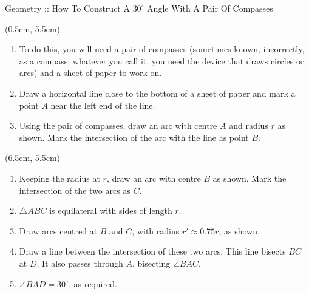 \documentclass[8pt,xcolor={svgnames, x11names}]{beamer}
\begin{document}
\begin{frame}{Geometry :: How To Construct A $30^\circ$ Angle With A Pair Of Compasses}
\begin{textblock*}{0.8\textwidth}
{\begin{scope}[scale=0.85]
			
			
		 \end{scope}
		} %
	\end{textblock*}

	

	\begin{textblock*}{0.55\textwidth}(0.5cm, 5.5cm)
		
		\begin{enumerate}
			\item<1-8 | alert@1> To do this, you will need a pair of compasses (sometimes known, incorrectly, as a compass: whatever you call it, you need the device that draws circles or arcs) and a sheet of paper to work on.
			\item<2-8 | alert@2> Draw a horizontal line close to the bottom of a sheet of paper and mark a point $A$ near the left end of the line.
			\item<3-8 | alert@3> Using the pair of compasses, draw an arc with centre $A$ and radius $r$ as shown. Mark the intersection of the arc with the line as point $B$.
			\suspend
		\end{enumerate}
	
	\end{textblock*}
	\begin{textblock*}{0.55\textwidth}(6.5cm, 5.5cm)
		
		\begin{enumerate}
			\resume
			\item<4-8 | alert@4> Keeping the radius at $r$, draw an arc with centre $B$ as shown. Mark the intersection of the two arcs as $C$.
			\item<5-8 | alert@5> $\triangle ABC$ is equilateral with sides of length $r$.
			\item<6-8 | alert@6> Draw arcs centred at $B$ and $C$, with radius $r'\approx 0.75r$, as shown.
			\item<7-8 | alert@7> Draw a line between the intersection of these two arcs. This line bisects $BC$ at $D$. It also passes through $A$, bisecting $\angle BAC$.
			\item<8 | alert@8> $\angle BAD = 30^\circ$, as required.
			\suspend
		\end{enumerate}
	
	\end{textblock*}





	
		

\end{frame}
\end{document}
